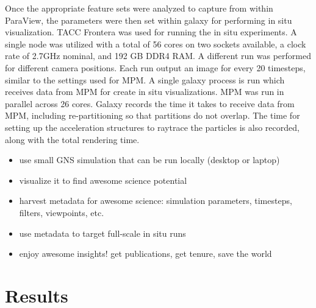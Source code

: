 \documentclass{vgtc}
\begin{document}
Once the appropriate feature sets were analyzed to capture from within ParaView, the parameters were then set within galaxy for performing in situ visualization. TACC Frontera \cite{stanzione20frontera} was used for running the in situ experiments. A single node was utilized with a total of 56 cores on two sockets available, a clock rate of 2.7GHz nominal, and 192 GB DDR4 RAM. A different run was performed for different camera positions. Each run output an image for every 20 timesteps, similar to the settings used for MPM. A single galaxy process is run which receives data from MPM for create in situ visualizations. MPM was run in parallel across 26 cores. Galaxy records the time it takes to receive data from MPM, including re-partitioning so that partitions do not overlap. The time for setting up the acceleration structures to raytrace the particles is also recorded, along with the total rendering time.

\begin{itemize}
    \item use small GNS simulation that can be run locally (desktop or laptop)
    \item visualize it to find awesome science potential
    \item harvest metadata for awesome science: simulation parameters, timesteps, filters, viewpoints, etc.
    \item use metadata to target full-scale in situ runs
    \item enjoy awesome insights! get publications, get tenure, save the world
\end{itemize}


\section{Results}
\label{sec:results}
\end{document}
